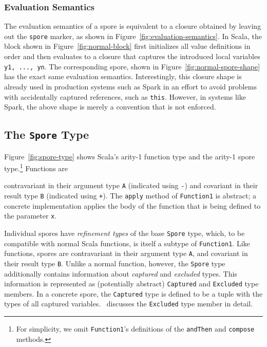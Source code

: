 \documentclass{easychair}
\begin{document}
\subsubsection{Evaluation Semantics}

The evaluation semantics of a spore is equivalent to a closure
obtained by leaving out the \verb|spore| marker, as shown in
Figure~\ref{fig:evaluation-semantics}. In Scala, the block shown in
Figure~\ref{fig:normal-block} first initializes
all value definitions in order and then evaluates to a closure that captures
the introduced local variables \verb|y1, ..., yn|. The corresponding spore,
shown in Figure~\ref{fig:normal-spore-shape} has the exact same evaluation
semantics. Interestingly, this closure shape is already used in production
systems such as Spark in an effort to avoid problems with accidentally
captured references, such as \verb|this|. However, in systems like Spark, the
above shape is merely a convention that is not enforced.

\vspace{2mm}
\subsection{The \texttt{Spore} Type}
\label{sec:spore-type}




Figure~\ref{fig:spore-type} shows Scala's arity-1 function type and the arity-1 spore type.\footnote{For simplicity, we omit \texttt{Function1}'s definitions of the \texttt{andThen} and \texttt{compose} methods.}
Functions are

\noindent contravariant in their argument type \verb|A| (indicated using
\verb|-|) and covariant in their result type \verb|B| (indicated
using \verb|+|). The \verb|apply| method of \verb|Function1| is abstract; a concrete implementation applies
the body of the function that is being defined to the parameter \verb|x|.

Individual spores have {\em refinement types} of the base \verb|Spore| type, which, to be compatible with normal Scala functions,
is itself a subtype of \verb|Function1|. Like functions, spores are contravariant in their argument type \verb|A|, and
covariant in their result type \verb|B|. Unlike a normal function,
however, the \verb|Spore| type additionally contains information about
\textit{captured} and \textit{excluded} types. This information is represented
as (potentially abstract) \verb|Captured| and \verb|Excluded| type members. In a
concrete spore, the \verb|Captured| type is defined to be a tuple with the types of all captured variables.
\cite{MillerHO14}~discusses the \verb|Excluded| type member in detail.
\end{document}
